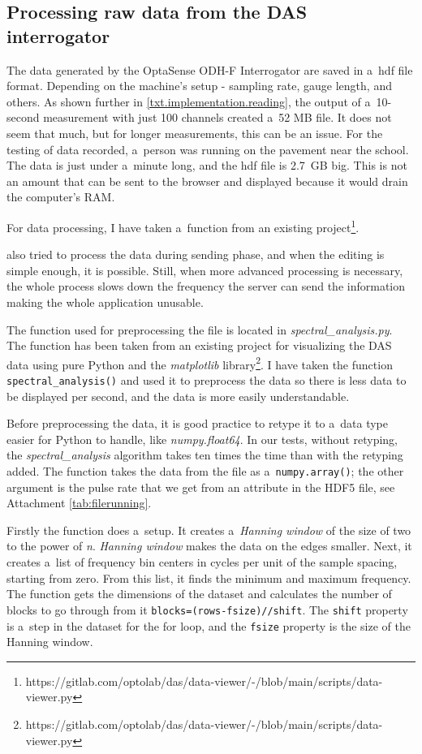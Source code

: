 \subsection{Processing raw data from the DAS interrogator}\label{txt.design.datapprocessing}

The data generated by the OptaSense ODH-F Interrogator are saved in a~\ac{hdf} file format. Depending on the machine's setup - sampling rate, gauge length, and others. As shown further in \ref{txt.implementation.reading}, the output of a~10-second measurement with just 100 channels created a~52 MB file. It does not seem that much, but for longer measurements, this can be an issue. For the testing of data recorded, a~person was running on the pavement near the school. The data is just under a~minute long, and the \ac{hdf} file is \qty{2.7}{GB} big. This is not an amount that can be sent to the browser and displayed because it would drain the computer's RAM. 

For data processing, I have taken a~function from an existing project\footnote{https://gitlab.com/optolab/das/data-viewer/-/blob/main/scripts/data-viewer.py}. 

also tried to process the data during sending phase, and when the editing is simple enough, it is possible. Still, when more advanced processing is necessary, the whole process slows down the frequency the server can send the information making the whole application unusable. 

The function used for preprocessing the file is located in \textit{spectral\_analysis.py}. The function has been taken from an existing project for visualizing the DAS data using pure Python and the \textit{matplotlib} library\footnote{https://gitlab.com/optolab/das/data-viewer/-/blob/main/scripts/data-viewer.py}. I have taken the function \texttt{spectral\_analysis()} and used it to preprocess the data so there is less data to be displayed per second, and the data is more easily understandable. 

Before preprocessing the data, it is good practice to retype it to a~data type easier for Python to handle, like \textit{numpy.float64}. In our tests, without retyping, the \textit{spectral\_analysis} algorithm takes ten times the time than with the retyping added. The function takes the data from the file as a~\texttt{numpy.array()}; the other argument is the pulse rate that we get from an attribute in the HDF5 file, see Attachment \ref{tab:filerunning}. 

Firstly the function does a~setup. It creates a~\textit{Hanning window} of the size of two to the power of \textit{n}. \textit{Hanning window} makes the data on the edges smaller. Next, it creates a~list of frequency bin centers in cycles per unit of the sample spacing, starting from zero. From this list, it finds the minimum and maximum frequency. The function gets the dimensions of the dataset and calculates the number of blocks to go through from it \texttt{blocks=(rows-fsize)//shift}. The \texttt{shift} property is a~step in the dataset for the for loop, and the \texttt{fsize} property is the size of the Hanning window. 

